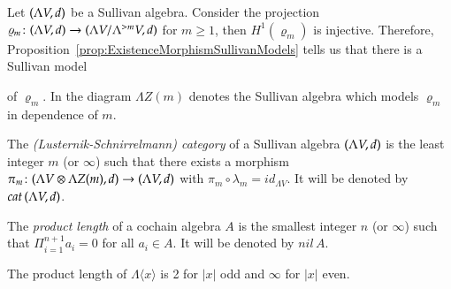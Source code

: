 \par

Let $(\Lambda V,d)$ be a Sullivan algebra. Consider the projection 
$\varrho_m \colon (\Lambda V,d) \to (\Lambda V / \Lambda^{> m} V , d)$ for $m \geq 1$, then $H^1(\varrho_m)$ is injective.
Therefore, Proposition~\ref{prop:ExistenceMorphismSullivanModels} tells us that there is a Sullivan model

\centerline{
}

of $\varrho_m$. In the diagram $\Lambda Z(m)$ denotes the Sullivan algebra which models $\varrho_m$ in dependence of $m$.

\begin{Definition}
\label{def:LSCategory}
 The \emph{(Lusternik-Schnirrelmann) category} of a Sullivan algebra $(\Lambda V,d)$ is the 
 least integer $m$ (or $\infty$) such that there exists a morphism 
 $\pi_m \colon (\Lambda V \otimes \Lambda Z(m) , d) \to (\Lambda V,d)$ with $\pi_m \circ \lambda_m = id_{\Lambda V}$.
 It will be denoted by $cat \, (\Lambda V,d)$.
\end{Definition}

\begin{Definition}
 The \emph{product length} of a cochain algebra $A$ is the smallest integer $n$ (or $\infty$) such that 
 $\Pi_{i = 1}^{n+1} a_i = 0$  for all $a_i \in A$. It will be denoted by $nil \,A$.
\end{Definition}

\begin{Example}
 The product length of $\Lambda \langle x \rangle$ is 2 for $|x|$ odd and $\infty$ for $|x|$ even.
\end{Example}

